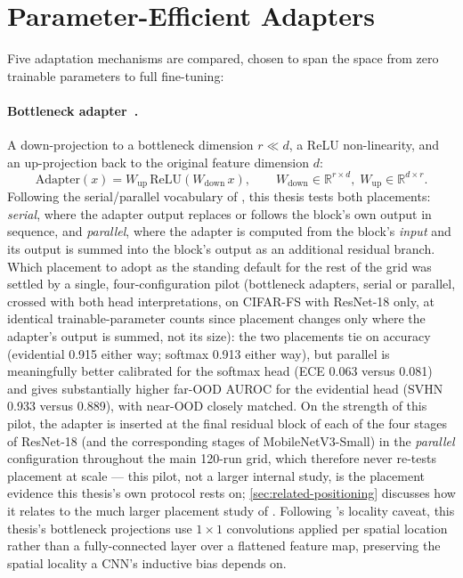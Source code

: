 \documentclass{iutbscthesis}
\begin{document}
\section{Parameter-Efficient Adapters}
\label{sec:method-adapters}

Five adaptation mechanisms are compared, chosen to span the space from zero trainable parameters to full fine-tuning:

\paragraph{Bottleneck adapter~\cite{houlsby2019adapters}.} A down-projection to a bottleneck dimension $r \ll d$, a ReLU non-linearity, and an up-projection back to the original feature dimension $d$:
\begin{equation}
    \mathrm{Adapter}(x) = W_{\text{up}} \, \mathrm{ReLU}\!\left( W_{\text{down}} \, x \right), \qquad W_{\text{down}} \in \mathbb{R}^{r \times d}, \; W_{\text{up}} \in \mathbb{R}^{d \times r}.
    \label{eq:bottleneck}
\end{equation}
Following the serial/parallel vocabulary of \textcite{he2022unified}, this thesis tests both placements: \emph{serial}, where the adapter output replaces or follows the block's own output in sequence, and \emph{parallel}, where the adapter is computed from the block's \emph{input} and its output is summed into the block's output as an additional residual branch. Which placement to adopt as the standing default for the rest of the grid was settled by a single, four-configuration pilot (bottleneck adapters, serial or parallel, crossed with both head interpretations, on CIFAR-FS with ResNet-18 only, at identical trainable-parameter counts since placement changes only where the adapter's output is summed, not its size): the two placements tie on accuracy (evidential 0.915 either way; softmax 0.913 either way), but parallel is meaningfully better calibrated for the softmax head (ECE 0.063 versus 0.081) and gives substantially higher far-OOD AUROC for the evidential head (SVHN 0.933 versus 0.889), with near-OOD closely matched. On the strength of this pilot, the adapter is inserted at the final residual block of each of the four stages of ResNet-18 (and the corresponding stages of MobileNetV3-Small) in the \emph{parallel} configuration throughout the main 120-run grid, which therefore never re-tests placement at scale — this pilot, not a larger internal study, is the placement evidence this thesis's own protocol rests on; \autoref{sec:related-positioning} discusses how it relates to the much larger placement study of \textcite{li2022tsa}. Following \textcite{chen2024convadapter}'s locality caveat, this thesis's bottleneck projections use $1{\times}1$ convolutions applied per spatial location rather than a fully-connected layer over a flattened feature map, preserving the spatial locality a CNN's inductive bias depends on.
\end{document}
